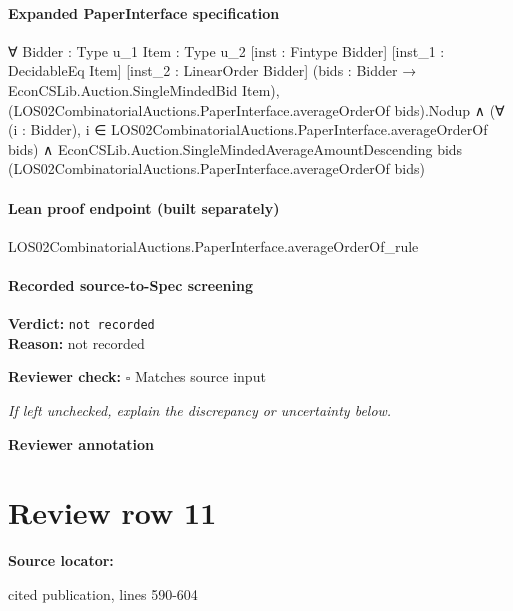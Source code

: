 \documentclass[10pt]{article}
\newcommand{\reviewerbox}{%
  \par\noindent\fbox{\parbox{0.96\linewidth}{\rule{0pt}{0.38in}}}\par
}
\newcommand{\reviewmatch}[1]{%
  \par\noindent\textbf{Reviewer check:} $\square$\; #1\par
  \noindent\emph{If left unchecked, explain the discrepancy or uncertainty below.}\par
}
\begin{document}
\paragraph{Expanded PaperInterface specification}
\begin{ReviewVerbatim}
∀ {Bidder : Type u_1} {Item : Type u_2} [inst : Fintype Bidder] [inst_1 : DecidableEq Item]
  [inst_2 : LinearOrder Bidder] (bids : Bidder → EconCSLib.Auction.SingleMindedBid Item),
  (LOS02CombinatorialAuctions.PaperInterface.averageOrderOf bids).Nodup ∧
    (∀ (i : Bidder), i ∈ LOS02CombinatorialAuctions.PaperInterface.averageOrderOf bids) ∧
      EconCSLib.Auction.SingleMindedAverageAmountDescending bids
        (LOS02CombinatorialAuctions.PaperInterface.averageOrderOf bids)
\end{ReviewVerbatim}

\paragraph{Lean proof endpoint (built separately)}\begin{ReviewVerbatim}
LOS02CombinatorialAuctions.PaperInterface.averageOrderOf_rule
\end{ReviewVerbatim}

\paragraph{Recorded source-to-Spec screening}
\textbf{Verdict:} \texttt{not recorded}
\\
\textbf{Reason:} not recorded
\reviewmatch{Matches source input}
\noindent\textbf{Reviewer annotation}\par
\reviewerbox
\clearpage
\hypertarget{source-claim-b6d878da6257cc9c}{}
\section*{Review row 11}
\textbf{Source locator:} {\footnotesize\raggedright cited publication, lines 590-\allowbreak{}604\par}
\end{document}
